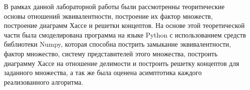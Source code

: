 \documentclass[spec, och, labwork]{shiza}
\begin{document}
\conclusion

В рамках данной лабораторной работы были рассмотренны теоритические основы  отношений эквивалентности, построение их фактор
множеств, построение диаграмм Хассе и решетки концептов. На основе этой теоретической части была смоделирована программа на языке Python с 
использованием средств библиотеки Numpy, которая способна пострить замыкание эквивалентности, фактор множество, систему представителей этого множества,
построить диаграмму Хассе на отношение делимости и построить решетку концептов для заданного множества, а так же была оценена асимптотика каждого реализованного
алгоритма.
\end{document}
